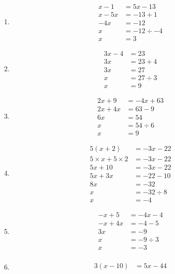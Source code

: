 \documentclass[11pt]{article}
\begin{document}
\begin{multicols}{3}
\begin{enumerate}
    \item
    \begin{align*}
       x - 1 &= 5x - 13 \\
       x - 5x &= - 13 + 1 \\
       -4x &= -12 \\
       x &= -12 \div -4 \\
       x &= 3 
    \end{align*}
    \item
    \begin{align*}
        3x - 4 &= 23 \\
        3x &= 23 + 4 \\ 
        3x &= 27 \\
        x &= 27 \div 3 \\
        x &= 9
    \end{align*}
    \item
    \begin{align*}
        2x + 9 &= -4x + 63 \\
        2x + 4x &= 63 - 9 \\
        6x &= 54 \\
        x &= 54 \div 6 \\
        x &= 9 
    \end{align*}
    \item
    \begin{align*}
       5(x + 2) &= -3x - 22 \\
       5 \times x + 5 \times 2 &= -3x - 22 \\
       5x + 10 &= -3x - 22\\
       5x + 3x &= -22  - 10 \\
       8x &= -32 \\
       x &= -32 \div 8\\
       x &= -4  
    \end{align*}
    \item
    \begin{align*}
       -x + 5 &= -4x - 4  \\
       -x + 4x &= - 4 - 5  \\
       3x &= -9 \\
       x &= -9 \div 3 \\
       x &= -3 \\
    \end{align*}
    \item
    \begin{align*}
       3(x - 10) &= 5x - 44 \\

\end{align*}
\end{enumerate}
\end{multicols}
\end{document}
